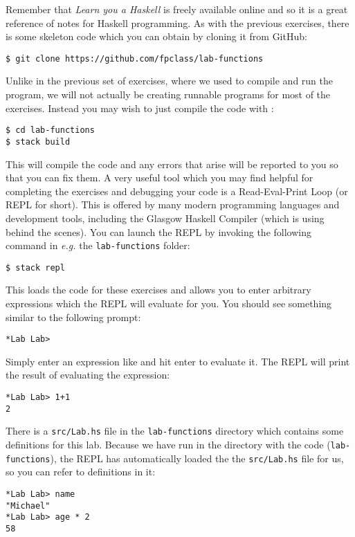 Remember that \emph{Learn you a Haskell} is freely available online and so it is a great reference of notes for Haskell programming. As with the previous exercises, there is some skeleton code which you can obtain by cloning it from GitHub:
\begin{verbatim}
$ git clone https://github.com/fpclass/lab-functions
\end{verbatim}
Unlike in the previous set of exercises, where we used  to compile and run the program, we will not actually be creating runnable programs for most of the exercises. Instead you may wish to just compile the code with :
\begin{verbatim}
$ cd lab-functions
$ stack build
\end{verbatim}
This will compile the code and any errors that arise will be reported to you so that you can fix them. A very useful tool which you may find helpful for completing the exercises and debugging your code is a Read-Eval-Print Loop (or REPL for short). This is offered by many modern programming languages and development tools, including the Glasgow Haskell Compiler (which  is using behind the scenes). You can launch the REPL by invoking the following command in \emph{e.g.} the \texttt{\small lab-functions} folder:
\begin{verbatim}
$ stack repl
\end{verbatim}
This loads the code for these exercises and allows you to enter arbitrary expressions which the REPL will evaluate for you. You should see something similar to the following prompt:
\begin{verbatim}
*Lab Lab>
\end{verbatim}
Simply enter an expression like  and hit enter to evaluate it. The REPL will print the result of evaluating the expression:
\begin{verbatim}
*Lab Lab> 1+1
2
\end{verbatim}
There is a \texttt{\small src/Lab.hs} file in the \texttt{\small lab-functions} directory which contains some definitions for this lab. Because we have run  in the directory with the code (\texttt{\small lab-functions}), the REPL has automatically loaded the the \texttt{\small src/Lab.hs} file for us, so you can refer to definitions in it:
\begin{verbatim}
*Lab Lab> name
"Michael"
*Lab Lab> age * 2
58
\end{verbatim}

